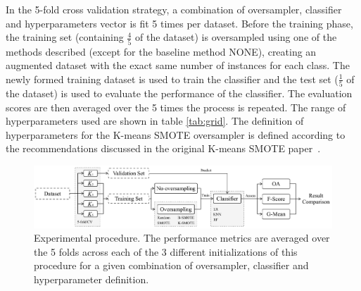 \documentclass[preprint,12pt]{elsarticle}
\begin{document}
In the 5-fold cross validation strategy, a combination
of oversampler, classifier and hyperparameters vector is fit 5 times
per dataset. Before the training
phase, the training set
(containing $\frac{4}{5}$ of the dataset) is oversampled using one of the methods
described (except for the baseline method NONE), creating an augmented
dataset with the exact same number of instances for
each class. The newly formed training dataset is used to train the classifier
and the test set ($\frac{1}{5}$ of the dataset)
is used to evaluate the performance of the classifier. The evaluation scores
are then averaged over the 5 times the process is repeated. The range of
hyperparameters used are shown in table \ref{tab:grid}. The definition of
hyperparameters for the K-means SMOTE oversampler is defined according to the
recommendations discussed in the original K-means SMOTE
paper~\cite{Douzas2018}.

\begin{figure}
	\centering
    \captionsetup{justification=centering}
    \caption{Experimental procedure. The performance metrics are averaged over
    the 5 folds across each of the 3 different initializations of this
    procedure for a given combination of oversampler, classifier and
    hyperparameter definition.
    \vspace{.25cm}}\label{fig:experiment_pipeline}
	\includegraphics[width=1\linewidth]{../analysis/experiment_pipeline}
\end{figure}
\end{document}
